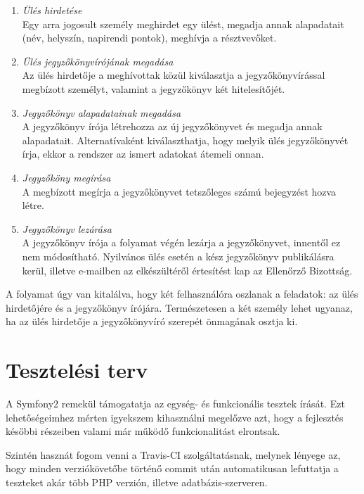 \documentclass[a4paper,12pt,oneside]{report}
\begin{document}
\begin{enumerate}
  \item \emph{Ülés hirdetése}\\
    Egy arra jogosult személy meghirdet egy ülést, megadja annak alapadatait (név, helyszín, napirendi pontok), meghívja a résztvevőket.
    
  \item \emph{Ülés jegyzőkönyvírójának megadása}\\
    Az ülés hirdetője a meghívottak közül kiválasztja a jegyzőkönyvírással megbízott személyt, valamint a jegyzőkönyv két hitelesítőjét.
    
  \item \emph{Jegyzőkönyv alapadatainak megadása}\\
    A jegyzőkönyv írója létrehozza az új jegyzőkönyvet és megadja annak alapadatait. Alternatívaként kiválaszthatja, hogy melyik ülés jegyzőkönyvét írja, ekkor a rendszer az ismert adatokat átemeli onnan.

  \item \emph{Jegyzőköny megírása}\\
    A megbízott megírja a jegyzőkönyvet tetszőleges számú bejegyzést hozva létre.
    
  \item \emph{Jegyzőkönyv lezárása}\\
    A jegyzőkönyv írója a folyamat végén lezárja a jegyzőkönyvet, innentől ez nem módosítható. Nyilvános ülés esetén a kész jegyzőkönyv publikálásra kerül, illetve e-mailben az elkészültéről értesítést kap az Ellenőrző Bizottság.
  
\end{enumerate}

A folyamat úgy van kitalálva, hogy két felhasználóra oszlanak a feladatok: az ülés hirdetőjére és a jegyzőkönyv írójára. Természetesen a két személy lehet ugyanaz, ha az ülés hirdetője a jegyzőkönyvíró szerepét önmagának osztja ki.

\section{Tesztelési terv}

A Symfony2 remekül támogatatja az egység- és funkcionális tesztek írását. Ezt lehetőségeimhez mérten igyekszem kihasználni megelőzve azt, hogy a fejlesztés későbbi részeiben valami már működő funkcionalitást elrontsak.

Szintén hasznát fogom venni a Travis-CI szolgáltatásnak, melynek lényege az, hogy minden verziókövetőbe történő commit után automatikusan lefuttatja a teszteket akár több PHP verzión, illetve adatbázis-szerveren.
\end{document}
